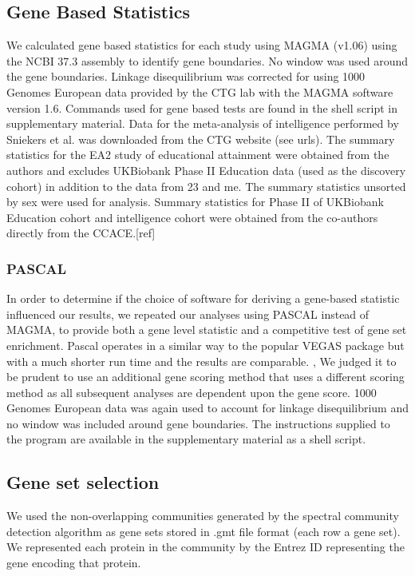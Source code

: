 \subsection{Gene Based Statistics}
We calculated gene based statistics for each study using MAGMA (v1.06) using the NCBI 37.3 assembly to identify gene boundaries. \cite{de2015magma}   No window was used around the gene boundaries. Linkage disequilibrium was corrected for using 1000 Genomes European data provided by the CTG lab with the MAGMA software version 1.6.\cite{de2015magma}  Commands used for gene based tests are found in the shell script in supplementary material. Data for the meta-analysis of intelligence performed by Sniekers  et al. was downloaded from the CTG website (see urls). \cite{sniekers2017genome}  The summary statistics for the EA2 study of educational attainment were obtained from the authors and excludes UKBiobank Phase II Education data (used as the discovery cohort) in addition to the data from 23 and me. \cite{okbay2016genome}  The summary statistics unsorted by sex were used for analysis. Summary statistics for Phase II of UKBiobank Education cohort and intelligence cohort were obtained from the co-authors directly from the CCACE.[ref]

\subsubsection{PASCAL}
\label{sec:PASCAL community detection}
In order to determine if the choice of software for deriving a gene-based statistic influenced our results, we repeated our analyses using PASCAL instead of MAGMA, to provide both a gene level statistic and a competitive test of gene set enrichment. \cite{lamparter2016fast}  Pascal operates in a similar way to the popular VEGAS package but with a much shorter run time and the results are comparable. \cite{lamparter2016fast},\cite{liu2010versatile}  We judged it to be prudent to use an additional gene scoring method that uses a different scoring method as all subsequent analyses are dependent upon the gene score. 1000 Genomes European data was again used to account for linkage disequilibrium and no window was included around gene boundaries. The instructions supplied to the program are available in the supplementary material as a shell script. 

\subsection{Gene set selection}
We used the non-overlapping communities generated by the spectral community detection algorithm as gene sets stored in .gmt file format (each row a gene set). We represented each protein in the community by the Entrez ID representing the gene encoding that protein. 

